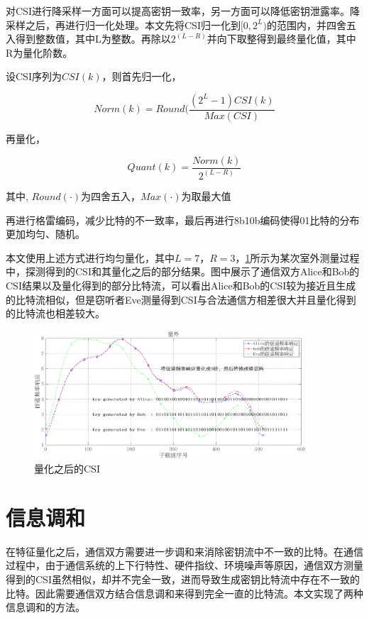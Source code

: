 对CSI进行降采样一方面可以提高密钥一致率，另一方面可以降低密钥泄露率。降采样之后，再进行归一化处理。本文先将CSI归一化到$[0, 2^L)$的范围内，并四舍五入得到整数值，其中L为整数。再除以$2^{(L - R)}$并向下取整得到最终量化值，其中R为量化阶数。

设CSI序列为$CSI(k)$，则首先归一化，

\begin{equation}
    Norm(k) = Round(\frac{(2^L - 1) CSI(k)}{Max(CSI)}
\end{equation}

再量化，

\begin{equation}
    Quant(k) = \frac{Norm(k)}{2^{(L - R)}}
\end{equation}

其中, $Round(\cdot)$为四舍五入，$Max(\cdot)$为取最大值

再进行格雷编码，减少比特的不一致率，最后再进行8b10b编码使得01比特的分布更加均匀、随机。

本文使用上述方式进行均匀量化，其中$L = 7$，$R = 3$，\ref{quantization_and_csi}所示为某次室外测量过程中，探测得到的CSI和其量化之后的部分结果。图中展示了通信双方Alice和Bob的CSI结果以及量化得到的部分比特流，可以看出Alice和Bob的CSI较为接近且生成的比特流相似，但是窃听者Eve测量得到CSI与合法通信方相差很大并且量化得到的比特流也相差较大。

\begin{figure}[htbp!]
    \centering \includegraphics[width=0.9\textwidth]{images/quantization_and_csi} 
    \caption{量化之后的CSI}
    \label{quantization_and_csi}
\end{figure}

\section{信息调和}

在特征量化之后，通信双方需要进一步调和来消除密钥流中不一致的比特。在通信过程中，由于通信系统的上下行特性、硬件指纹、环境噪声等原因，通信双方测量得到的CSI虽然相似，却并不完全一致，进而导致生成密钥比特流中存在不一致的比特。因此需要通信双方结合信息调和来得到完全一直的比特流。本文实现了两种信息调和的方法。

